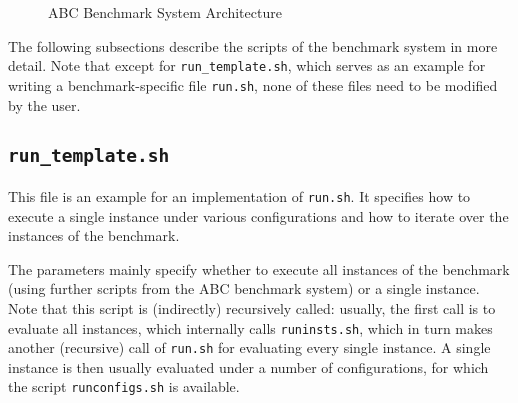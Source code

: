 \documentclass[a4paper]{article}
\newcommand{\abcs}{{ABC}}
\begin{document}
\begin{figure}
		\endpgfgraphicnamed
			
		\caption{\abcs{} Benchmark System Architecture}
		\label{fig:architecture}
		\end{figure}

		The following subsections describe the scripts of the benchmark system
		in more detail.
		Note that except for {\tt run\_template.sh}, which serves as an example
		for writing a benchmark-specific file {\tt run.sh}, none of these files need
		to be modified by the user.

		\subsection{\tt run\_template.sh}
		\label{sec:architecture:run}
		
			This file is an example for an implementation of {\tt run.sh}.
		    It specifies how to execute a single instance under various configurations
		    and how to iterate over the instances of the benchmark.
		    
		    The parameters mainly specify whether to execute all instances
		    of the benchmark (using further scripts from the \abcs{} benchmark system)
		    or a single instance.
		    Note that this script is (indirectly) recursively called:
		    usually, the first call is to evaluate all instances, which internally
		    calls {\tt runinsts.sh}, which in turn makes another (recursive) call of {\tt run.sh}
		    for evaluating every single instance.
		    A single instance is then usually evaluated under a number of configurations,
		    for which the script {\tt runconfigs.sh} is available.
\end{document}
